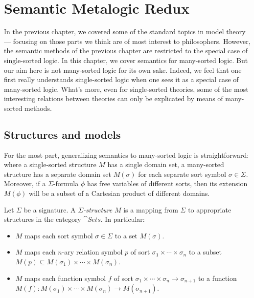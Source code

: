 \chapter{Semantic Metalogic Redux} \label{ch:sem2}


In the previous chapter, we covered some of the standard topics in
model theory --- focusing on those parts we think are of most interest
to philosophers.  However, the semantic methods of the previous
chapter are restricted to the special case of single-sorted logic.  In
this chapter, we cover semantics for many-sorted logic.  But our aim
here is not many-sorted logic for its own sake.  Indeed, we feel that
one first really understands single-sorted logic when one sees it as a
special case of many-sorted logic.  What's more, even for
single-sorted theories, some of the most interesting relations between
theories can only be explicated by means of many-sorted methods.

\section{Structures and models}

For the most part, generalizing semantics to many-sorted logic is
straightforward: where a single-sorted structure $M$ has a single
domain set, a many-sorted structure has a separate domain set
$M(\sigma )$ for each separate sort symbol $\sigma\in \Sigma$.
Moreover, if a $\Sigma$-formula $\phi$ has free variables of different
sorts, then its extension $M(\phi )$ will be a subset of a Cartesian
product of different domains.

\begin{defn} Let $\Sigma$ be a signature.  A
  \emph{$\Sigma$-structure} $M$ is a mapping from $\Sigma$ to
  appropriate structures in the category $\cat{Sets}$.  In particular:
  \begin{itemize}
  \item $M$ maps each sort symbol $\sigma \in \Sigma$ to a set
    $M(\sigma )$.
  \item $M$ maps each $n$-ary relation symbol $p$ of sort
    $\sigma _1\times\cdots \times \sigma _n$ to a subset
    $M(p)\subseteq M(\sigma _1)\times\cdots\times M(\sigma _n)$.
  \item $M$ maps each function symbol $f$ of sort
    $\sigma _1\times\cdots\times \sigma _n\to \sigma _{n+1}$ to a
    function
    $M(f):M(\sigma _1)\times \cdots \times M(\sigma _n)\to M(\sigma
    _{n+1})$.
  \end{itemize}
\end{defn}

